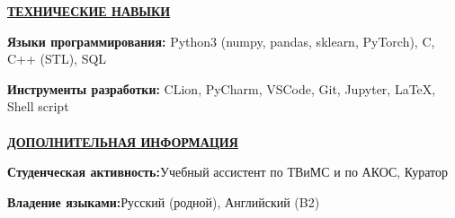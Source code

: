 \documentclass[11pt]{article}
\begin{document}
\noindent \textbf{\underline{ТЕХНИЧЕСКИЕ НАВЫКИ}}\\
 \par \textbf{Языки программирования:} \hfill Python3 (numpy, pandas, sklearn, PyTorch), C, C++ (STL), SQL\\
\par \textbf{Инструменты разработки:} \hfill CLion, PyCharm, VSCode, Git, Jupyter, \LaTeX{}, Shell script \\
\\

\noindent \textbf{\underline{ДОПОЛНИТЕЛЬНАЯ ИНФОРМАЦИЯ}} \\
\par \textbf{Студенческая активность:}\hfill Учебный ассистент по ТВиМС и по АКОС, Куратор\\
\par \textbf{Владение языками:}\hfill Русский (родной), Английский (B2)
\end{document}
